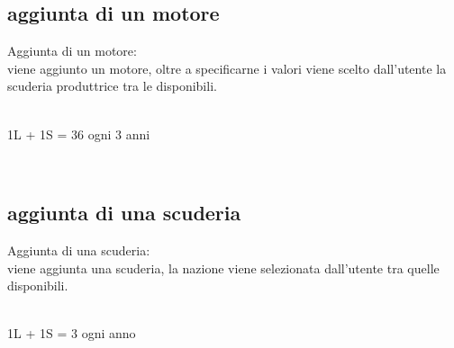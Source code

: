 \documentclass[a4paper,12pt]{report}
\begin{document}
	\subsection{aggiunta di un motore}
	Aggiunta di un motore:\\
	viene aggiunto un motore, oltre a specificarne i valori viene scelto dall'utente
	la scuderia produttrice tra le disponibili.
	\begin{table}[!htb]
		\centering
		\begin{center}
			\newline\\
			1L + 1S = 36 ogni 3 anni\\
		\end{center}
	\end{table}\\
	\subsection{aggiunta di una scuderia}
	Aggiunta di una scuderia:\\
	viene aggiunta una scuderia, la nazione viene selezionata dall'utente tra quelle disponibili.
	\begin{table}[!htb]
		\centering
		\begin{center}
		\newline\\
		1L + 1S = 3 ogni anno\\
		\end{center}
	\end{table}\\
\end{document}
